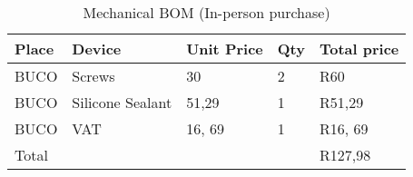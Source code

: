\documentclass[class=report,11pt,crop=false]{standalone}
\begin{document}
 

\begin{table}
\centering

\begin{tabular}{|l |l |l |l |l|} \hline 
Place & Device & Unit Price & Qty & Total price \\ \hline 
BUCO & Screws & 30 & 2 & R60 \\ \hline 
BUCO & Silicone Sealant & 51,29 & 1 & R51,29 \\ \hline 
BUCO & VAT & 16, 69 & 1 & R16, 69 \\ \hline 
Total &  &  &  & R127,98 \\ \hline

\end{tabular}
\caption{Mechanical BOM (In-person purchase)}
\label{tab:Mechanical BOM (In-person purchase)}
\end{table}


\ifstandalone

\printnoidxglossary[type=\acronymtype,nonumberlist]
\fi
\end{document}
